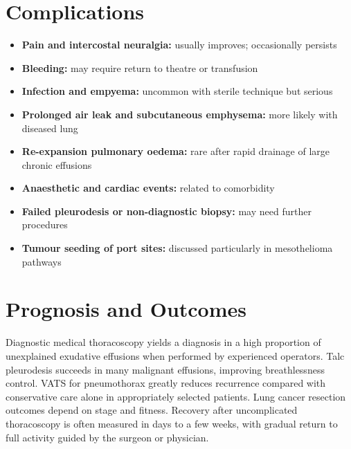 \section*{Complications}
\begin{itemize}
    \item \textbf{Pain and intercostal neuralgia:} usually improves; occasionally persists
    \item \textbf{Bleeding:} may require return to theatre or transfusion
    \item \textbf{Infection and empyema:} uncommon with sterile technique but serious
    \item \textbf{Prolonged air leak and subcutaneous emphysema:} more likely with diseased lung
    \item \textbf{Re-expansion pulmonary oedema:} rare after rapid drainage of large chronic effusions
    \item \textbf{Anaesthetic and cardiac events:} related to comorbidity
    \item \textbf{Failed pleurodesis or non-diagnostic biopsy:} may need further procedures
    \item \textbf{Tumour seeding of port sites:} discussed particularly in mesothelioma pathways
\end{itemize}

\section*{Prognosis and Outcomes}
Diagnostic medical thoracoscopy yields a diagnosis in a high proportion of unexplained exudative effusions when performed by experienced operators. Talc pleurodesis succeeds in many malignant effusions, improving breathlessness control. VATS for pneumothorax greatly reduces recurrence compared with conservative care alone in appropriately selected patients. Lung cancer resection outcomes depend on stage and fitness. Recovery after uncomplicated thoracoscopy is often measured in days to a few weeks, with gradual return to full activity guided by the surgeon or physician.

